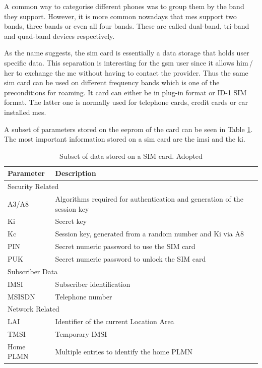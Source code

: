A common way to categorise different phones was to group them by the band they support.
However, it is more common nowadays that \glspl{me} support two bands, three bands or even all four bands.
These are called dual-band, tri-band and quad-band devices respectively.

As the name suggests, the \gls{sim} card is essentially a data storage that holds user specific data.
This separation is interesting for the \gls{gsm} user since it allows him\,/\,her to exchange the \gls{me} without having to contact the provider.
Thus the same \gls{sim} card can be used on different frequency bands which is one of the preconditions for roaming.
It card can either be in plug-in format or ID-1 SIM format.
The latter one is normally used for telephone cards, credit cards or car installed \glspl{me}.

A subset of parameters stored on the \gls{eeprom} of the card can be seen in Table \ref{tab:simdata}.
The most important information stored on a \gls{sim} card are the \gls{imsi} and the \gls{ki}.

\begin{table}
\centering
\begin{tabular}{@{}l>{\raggedright\arraybackslash}p{}@{}}
\toprule
Parameter		&Description\\
\midrule
\multicolumn{2}{l}{Security Related}\\
\midrule
A3/A8			&Algorithms required for authentication and generation of the session key\\
Ki				&Secret key\\
Kc				&Session key, generated from a random number and Ki via A8\\
PIN				&Secret numeric password to use the SIM card\\
PUK				&Secret numeric password to unlock the SIM card\\
\midrule
\multicolumn{2}{l}{Subscriber Data}\\
\midrule
IMSI			&Subscriber identification\\
MSISDN			&Telephone number\\
\midrule
\multicolumn{2}{l}{Network Related}\\
\midrule
LAI				&Identifier of the current Location Area\\
TMSI			&Temporary IMSI\\
Home PLMN		&Multiple entries to identify the home PLMN\\
\bottomrule
\end{tabular}
\caption{Subset of data stored on a SIM card. Adopted \cite{protocols1999}}
\label{tab:simdata}
\end{table}

